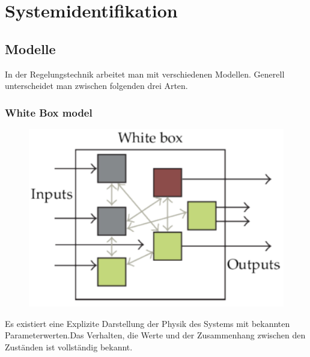  \section{Systemidentifikation}
    \subsection{Modelle}
        In der Regelungstechnik arbeitet man mit verschiedenen Modellen. Generell unterscheidet man zwischen folgenden drei Arten.
        \subsubsection{White Box model} 
         \begin{figure}
                \vspace{-6mm}
                \includegraphics[width=\linewidth]{images/06/Whitebox.jpg}
            \end{figure}
            Es existiert eine Explizite Darstellung der Physik des Systems mit bekannten Parameterwerten.Das Verhalten, die Werte und der Zusammenhang zwischen den Zuständen ist vollständig bekannt.

